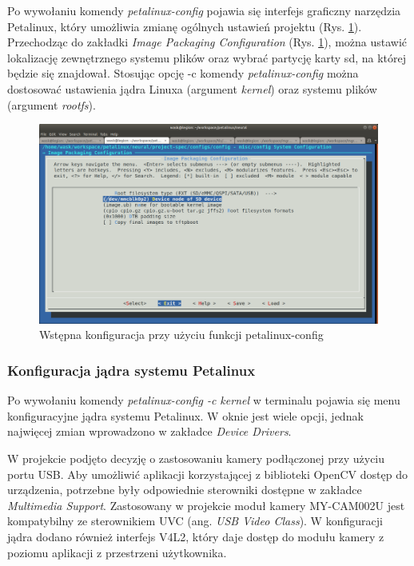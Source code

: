 Po wywołaniu komendy \emph{petalinux-config} pojawia się interfejs graficzny narzędzia Petalinux, który umożliwia 
zmianę ogólnych ustawień projektu (Rys. \ref{petalinux-config}). Przechodząc do zakładki \emph{Image Packaging 
Configuration} (Rys. \ref{petalinux-config}), można ustawić lokalizację zewnętrznego systemu plików oraz wybrać 
partycję karty sd, na której będzie się znajdował. Stosując opcję -c komendy \emph{petalinux-config} można dostosować 
ustawienia jądra Linuxa (argument \emph{kernel}) oraz systemu plików (argument \emph{rootfs}).

\begin{figure}[!h]
  \centering
  \includegraphics[width=\textwidth]{img/petalinux-config.png}
  \caption{Wstępna konfiguracja przy użyciu funkcji petalinux-config}
  \label{petalinux-config}
\end{figure}

\subsubsection{Konfiguracja jądra systemu Petalinux}

Po wywołaniu komendy \emph{petalinux-config -c kernel} w terminalu pojawia się menu konfiguracyjne jądra systemu 
Petalinux. W oknie jest wiele opcji, jednak najwięcej zmian wprowadzono w zakładce \emph{Device Drivers}. 

W projekcie podjęto decyzję o zastosowaniu kamery podłączonej przy użyciu portu USB. Aby umożliwić aplikacji 
korzystającej z biblioteki OpenCV dostęp do urządzenia, potrzebne były odpowiednie sterowniki \cite{usb-camera} 
dostępne w zakładce \emph{Multimedia Support}. Zastosowany w projekcie moduł kamery MY-CAM002U jest kompatybilny ze 
sterownikiem UVC (ang. \emph{USB Video Class}). W konfiguracji jądra dodano również interfejs V4L2, który daje dostęp 
do modułu kamery z poziomu aplikacji z przestrzeni użytkownika.


